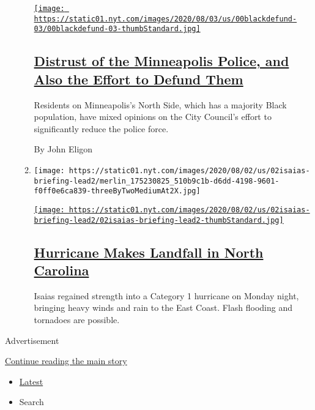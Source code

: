 \begin{enumerate}
\begin{enumerate}
    \href{/2020/08/04/us/minneapolis-defund-police.html}{\texttt{[image: https://static01.nyt.com/images/2020/08/03/us/00blackdefund-03/00blackdefund-03-thumbStandard.jpg]}}

    \hypertarget{distrust-of-the-minneapolis-police-and-also-the-effort-to-defund-them}{%
    \subsection{\texorpdfstring{\href{/2020/08/04/us/minneapolis-defund-police.html}{Distrust
    of the Minneapolis Police, and Also the Effort to Defund
    Them}}{Distrust of the Minneapolis Police, and Also the Effort to Defund Them}}\label{distrust-of-the-minneapolis-police-and-also-the-effort-to-defund-them}}

    Residents on Minneapolis's North Side, which has a majority Black
    population, have mixed opinions on the City Council's effort to
    significantly reduce the police force.

    By John Eligon
  \item
    \texttt{[image: https://static01.nyt.com/images/2020/08/02/us/02isaias-briefing-lead2/merlin\_175230825\_510b9c1b-d6dd-4198-9601-f0ff0e6ca839-threeByTwoMediumAt2X.jpg]}

    \href{/2020/08/03/us/isaias-storm-updates.html}{\texttt{[image: https://static01.nyt.com/images/2020/08/02/us/02isaias-briefing-lead2/02isaias-briefing-lead2-thumbStandard.jpg]}}

    \hypertarget{hurricane-makes-landfall-in-north-carolina}{%
    \subsection{\texorpdfstring{\href{/2020/08/03/us/isaias-storm-updates.html}{Hurricane
    Makes Landfall in North
    Carolina}}{Hurricane Makes Landfall in North Carolina}}\label{hurricane-makes-landfall-in-north-carolina}}

    Isaias regained strength into a Category 1 hurricane on Monday
    night, bringing heavy winds and rain to the East Coast. Flash
    flooding and tornadoes are possible.
  \end{enumerate}
\end{enumerate}

Advertisement

\protect\hyperlink{after-mid1}{Continue reading the main story}

\begin{itemize}
\tightlist
\item
  \protect\hyperlink{stream-panel}{Latest}
\item
  Search
\end{itemize}


